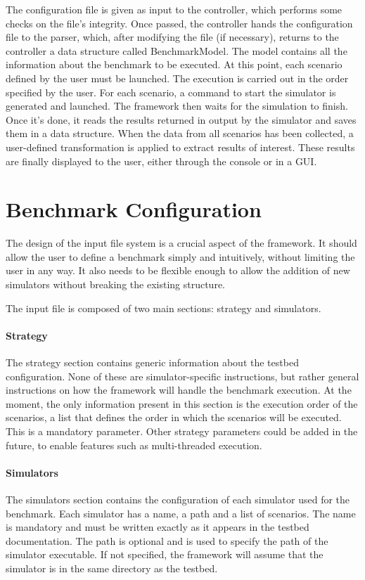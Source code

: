 \documentclass[12pt,a4paper,openright,twoside]{book}
\begin{document}
The configuration file is given as input to the controller, which performs some checks on the file's integrity. 
Once passed, the controller hands the configuration file to the parser, which, after modifying the file (if necessary), returns to the controller a data structure called BenchmarkModel.
The model contains all the information about the benchmark to be executed. 
At this point, each scenario defined by the user must be launched. 
The execution is carried out in the order specified by the user.
For each scenario, a command to start the simulator is generated and launched. 
The framework then waits for the simulation to finish. 
Once it's done, it reads the results returned in output by the simulator and saves them in a data structure. 
When the data from all scenarios has been collected, a user-defined transformation is applied to extract results of interest. 
These results are finally displayed to the user, either through the console or in a GUI.

\section{Benchmark Configuration}

The design of the input file system is a crucial aspect of the framework.
It should allow the user to define a benchmark simply and intuitively, without limiting the user in any way.
It also needs to be flexible enough to allow the addition of new simulators without breaking the existing structure.

The input file is composed of two main sections: strategy and simulators.

\paragraph*{Strategy} 
The strategy section contains generic information about the testbed configuration. 
None of these are simulator-specific instructions, but rather general instructions on how the framework will handle the benchmark execution.
At the moment, the only information present in this section is the execution order of the scenarios, 
a list that defines the order in which the scenarios will be executed. This is a mandatory parameter.
Other strategy parameters could be added in the future, to enable features such as multi-threaded execution.

\paragraph*{Simulators} 
The simulators section contains the configuration of each simulator used for the benchmark.
Each simulator has a name, a path and a list of scenarios. 
The name is mandatory and must be written exactly as it appears in the testbed documentation.
The path is optional and is used to specify the path of the simulator executable. 
If not specified, the framework will assume that the simulator is in the same directory as the testbed.
\end{document}
